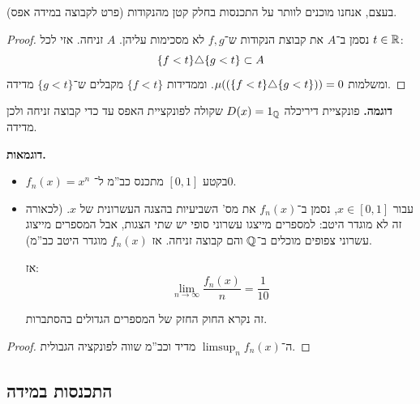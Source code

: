 \documentclass[name=רשימות פונקציות ממשיות – WIP]{../../../tex/classes/noChapterMegasumPreamble}
\newcommand\q   {1}
\begin{document}
	בעצם, אנחנו מוכנים לוותר על התכנסות בחלק קטן מהנקודות (פרט לקבוצה במידה אפס). 
	
	
	\begin{proof}
		נסמן ב־$A$ את קבוצת הנקודות ש־$f, g$ לא מסכימות עליהן. $A$ זניחה. אזי לכל $t \in \mathbb{R}$: 
		\[ \{f < t\} \triangle \{g < t\} \subset A \]
		ומשלמות $\mu((\{f < t\} \triangle \{g < t\})) = 0$. וממדידות $\{f < t\}$ מקבלים ש־$\{g < t\}$ מדידה. 
	\end{proof}
	
	\textbf{דוגמה. }פונקציית דיריכלה $D(x) = \q_\Q$ שקולה לפונקציית האפס עד כדי קבוצה זניחה ולכן מדידה. 
	
	
	\textbf{דוגמאות. }
	\begin{itemize}
		\item $f_n(x) = x^{n}$ בקטע $[0, 1]$ מתכנס כב''מ ל־$0$. 
		\item עבור $x \in [0, 1]$, נסמן ב־$f_n(x)$ את מס' השביעיות בהצגה העשרונית של $x$. (לכאורה זה לא מוגדר היטב: למספרים מייצגו עשרוני סופי יש שתי הצגות, אבל המספרים מייצוג עשרוני צפופים מוכלים ב־$\mathbb{Q}$ והם קבוצה זניחה. אז $f_n(x)$ מוגדר היטב כב''מ). 
		
		אז: 
		\[ \lim_{n\to\infty} \frac{f_n(x)}{n} = \frac{1}{10} \]
		
		זה נקרא החוק החזק של המספרים הגדולים בהסתברות.  
	\end{itemize}
	
	\begin{proof}
		ה־$\limsup_n f_n(x)$ מדיד וכב''מ שווה לפונקציה הגבולית. 
	\end{proof}
	

	
	\subsection{התכנסות במידה}\ 
	
\end{document}
